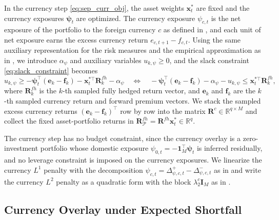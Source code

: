 In the currency step \eqref{eq:sep_curr_obj}, the asset weights $\bm{x}_t^*$ are fixed and the currency exposures
$\bm{\psi}_t$ are optimized. The currency exposure $\psi_{c,t}$ is the net exposure of the portfolio to the foreign currency $c$ as defined in
, and each unit of net exposure earns the excess currency return
$e_{c,t+1} - f_{c,t}$. Using the same auxiliary
representation for the risk measures and the empirical approximation as in , we introduce $\alpha_\psi$ and auxiliary variables $u_{k,\psi} \ge 0$, and the slack constraint
\eqref{eq:slack_constraint} becomes
\begin{equation*}
    u_{k,\psi} \ge -\bm{\psi}_t^\top (\bm{e}_k - \bm{f}_k) - \bm{x}_t^{*\top} \bm{R}^{fh}_k - \alpha_\psi
    \quad \Longleftrightarrow \quad
    -\bm{\psi}_t^\top (\bm{e}_k - \bm{f}_k) - \alpha_\psi - u_{k,\psi} \le \bm{x}_t^{*\top} \bm{R}^{fh}_k,
\end{equation*}
where $\bm{R}^{fh}_k$ is the $k$-th sampled fully hedged return vector, and $\bm{e}_k$ and $\bm{f}_k$ are the $k$-th
sampled currency return and forward premium vectors. We stack the sampled excess currency returns $(\bm{e}_k - \bm{f}_k)^\top$ row by row into the matrix
$\bm{R}^c \in \mathbb{R}^{q \times M}$ and collect the fixed asset-portfolio returns in
$\bm{R}^{fh}_{\mathcal{P}} = \bm{R}^{fh} \bm{x}_t^* \in \mathbb{R}^q$.

The currency step has no budget constraint, since the currency overlay is a zero-investment portfolio whose domestic
exposure $\psi_{0,t} = -\bm{1}_M^\top \bm{\psi}_t$ is inferred residually, and no leverage constraint is imposed on the
currency exposures. We linearize the currency $L^1$ penalty with the decomposition
$\psi_{c,t} = \Delta_{\psi,c,t}^+ - \Delta_{\psi,c,t}^-$ as in  and write the currency $L^2$ penalty as
a quadratic form with the block $\lambda_2^c \bm{I}_M$ as in .

\subsection{Currency Overlay under Expected Shortfall} \label{app:sep_curr_es}

